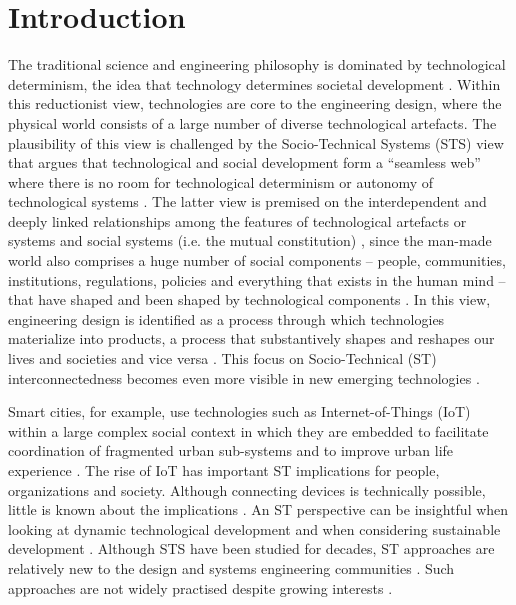 \section{Introduction}
\label{sec:intro}

The traditional science and engineering philosophy is dominated by technological determinism, the idea that technology determines societal development \cite{Mody2006,Sawyer2014,Smith1994}. Within this reductionist view, technologies are core to the engineering design, where the physical world consists of a large number of diverse technological artefacts. 
The plausibility of this view is challenged by the Socio-Technical Systems (STS) view \cite{VanDam2012} that argues that technological and social development form a ``seamless web'' where there is no room for technological determinism or autonomy of technological systems \cite{Fleischhacker2004}. 
%
The latter view is premised on the interdependent and deeply linked relationships among the features of technological artefacts or systems and social systems (i.e. the mutual constitution) \cite{Sawyer2014}, since the man-made world also comprises a huge number of social components -- people, communities, institutions, regulations, policies and everything that exists in the human mind -- that have shaped and been shaped by technological components \cite{Harari2014,VanDam2012}. 
In this view, engineering design is identified as a process through which technologies materialize into products, a process that substantively  shapes  and  reshapes  our  lives  and   societies and vice versa \cite{Kroes2008}. This focus on Socio-Technical (ST) interconnectedness becomes even  more  visible in new emerging technologies \cite{Kroes2008}.  

Smart cities, for example, use technologies such as Internet-of-Things (IoT) within a large complex social context in which they are embedded to facilitate coordination of fragmented urban sub-systems and to improve urban  life experience \cite{Glasmeier2015}. 
% 
The rise of IoT has important ST implications for people, organizations and society. Although connecting devices is technically possible, little is known about the implications \cite{Shin2014}. An ST perspective can be insightful when looking at dynamic technological development and when considering sustainable development \cite{Shin2014}. Although STS have been studied for decades, ST approaches are relatively new to the design and systems engineering communities \cite{Baxter2011,Norman2015,Sawyer2014}. Such approaches are not widely practised despite growing interests \cite{Baxter2011}. %

